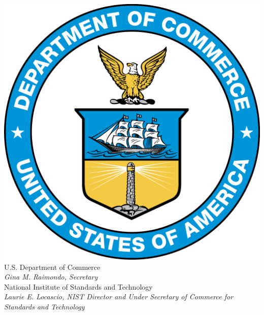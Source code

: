 \begin{titlepage}
\begin{flushright}
\includegraphics[width=0.2\linewidth]{DoC-logo.pdf}\\ 

  \tagmcend
 \tagstructend
 \tagpdfparaOn
\vfill
\footnotesize U.S. Department of Commerce\\ 
\textit{Gina M. Raimondo, Secretary}\\
\vspace{10pt}
National Institute of Standards and Technology\\ 
\hspace*{-3cm}\textit{Laurie E. Locascio, NIST Director and Under Secretary of Commerce for Standards and Technology}  

\end{flushright}

\end{titlepage}
